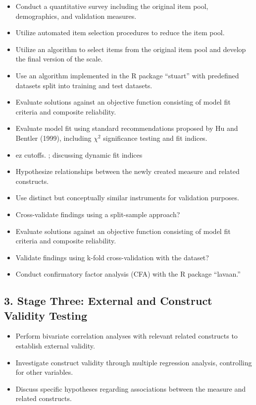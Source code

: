 \documentclass[
  12pt,
  a4paper,
  twoside]{article}
\providecommand{\tightlist}{%
  \setlength{\itemsep}{0pt}\setlength{\parskip}{0pt}}
\begin{document}
\begin{itemize}
\tightlist
\item
  Conduct a quantitative survey including the original item pool,
  demographics, and validation measures.
\item
  Utilize automated item selection procedures to reduce the item pool.
\item
  Utilize an algorithm to select items from the original item pool and
  develop the final version of the scale.
\item
  Use an algorithm implemented in the R package ``stuart'' with
  predefined datasets split into training and test datasets.
\item
  Evaluate solutions against an objective function consisting of model
  fit criteria and composite reliability.
\item
  Evaluate model fit using standard recommendations proposed by Hu and
  Bentler (1999), including \(\chi^2\) significance testing and fit
  indices.
\item
  ez cutoffs. ; discussing dynamic fit indices
\item
  Hypothesize relationships between the newly created measure and
  related constructs.
\item
  Use distinct but conceptually similar instruments for validation
  purposes.
\item
  Cross-validate findings using a split-sample approach?
\item
  Evaluate solutions against an objective function consisting of model
  fit criteria and composite reliability.
\item
  Validate findings using k-fold cross-validation with the dataset?
\item
  Conduct confirmatory factor analysis (CFA) with the R package
  ``lavaan.''
\end{itemize}

\subsection{3. Stage Three: External and Construct Validity
Testing}\label{stage-three-external-and-construct-validity-testing}

\begin{itemize}
\tightlist
\item
  Perform bivariate correlation analyses with relevant related
  constructs to establish external validity.
\item
  Investigate construct validity through multiple regression analysis,
  controlling for other variables.
\item
  Discuss specific hypotheses regarding associations between the measure
  and related constructs.
\end{itemize}
\end{document}
